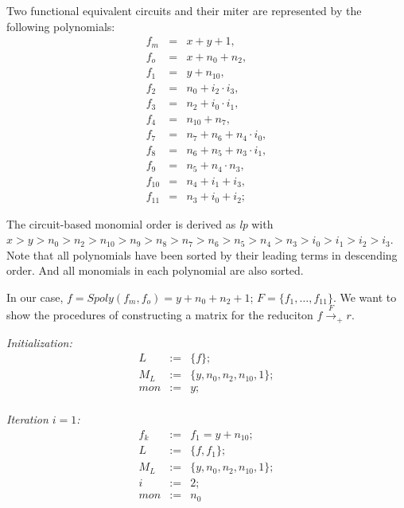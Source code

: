 \begin{Example}\label{exp:consmatix}
	Two functional equivalent circuits and their miter are 
	represented by the following polynomials:
	\begin{eqnarray}
		f_m&=&x+y+1, \nonumber \\
		f_o&=&x+n_0+n_2, \nonumber \\
		f_1&=&y+n_{10}, \nonumber \\
		f_2&=&n_0+i_2\cdot i_3, \nonumber \\
		f_3&=&n_2+i_0\cdot i_1, \nonumber \\
		f_4&=&n_{10}+n_7, \nonumber \\
		f_{7}&=&n_7+n_6+n_4\cdot i_0, \nonumber \\
		f_{8}&=&n_6+n_5+n_3\cdot i_1, \nonumber \\
		f_{9}&=&n_5+n_4\cdot n_3,  \nonumber \\
		f_{10}&=&n_4+i_1+i_3, \nonumber \\
		f_{11}&=&n_3+i_0+i_2;\nonumber 
	\end{eqnarray}
	
	The circuit-based monomial order is derived as {\it lp} with  
	$x>y>n_0>n_2>n_{10}>n_9>n_8>n_7>n_6>n_5>n_4>n_3>i_0>i_1>i_2>i_3$.
	Note that all polynomials have been sorted by their leading terms in descending order.
	And all monomials in each polynomial are also sorted.
	
	In our case, $f=Spoly(f_{m},f_{o})=y+n_0+n_2+1$; $F=\{f_{1},\dots, f_{11}\}$. 
	We want to show the procedures of constructing a matrix for the reduciton $f \xrightarrow{F}_{+}r$.
	
		
	{\it Initialization:}
	\begin{eqnarray}
		L&:=&\{f\}; \nonumber \\
		M_{L}&:=&\{ y,n_0,n_2,n_{10},1\}; \nonumber \\
		mon&:=& y ;\nonumber
	\end{eqnarray}\\
	
	{\it Iteration $i=1$:}	
	\begin{eqnarray}
		f_{k}&:=&f_{1}=y+n_{10}; \nonumber \\
		L&:=&\{f,f_1\}; \nonumber \\
		M_{L}&:=&\{ y,n_0,n_2,n_{10},1\}; \nonumber \\
		i&:=&2;  \nonumber \\
		mon&:=& n_0\nonumber 
	\end{eqnarray}\\
	

\end{Example}
